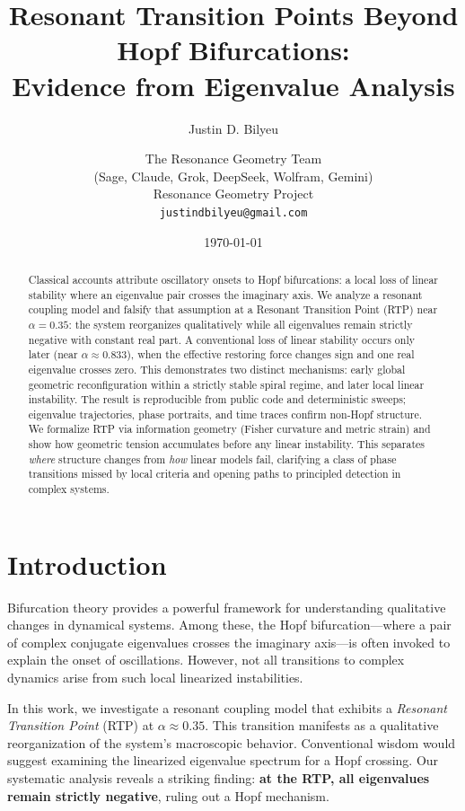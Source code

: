 \documentclass[11pt,twocolumn]{article}
\title{Resonant Transition Points Beyond Hopf Bifurcations:\\
Evidence from Eigenvalue Analysis}
\author{%
  Justin D. Bilyeu \and The Resonance Geometry Team\\
  (Sage, Claude, Grok, DeepSeek, Wolfram, Gemini)\\[0.5em]
  Resonance Geometry Project\\
  \texttt{justindbilyeu@gmail.com}
}
\date{\today}
\begin{document}
\maketitle

\begin{abstract}
Classical accounts attribute oscillatory onsets to Hopf bifurcations: a local loss of linear stability where an eigenvalue pair crosses the imaginary axis. We analyze a resonant coupling model and falsify that assumption at a Resonant Transition Point (RTP) near $\alpha\!=\!0.35$: the system reorganizes qualitatively while all eigenvalues remain strictly negative with constant real part. A conventional loss of linear stability occurs only later (near $\alpha\!\approx\!0.833$), when the effective restoring force changes sign and one real eigenvalue crosses zero. This demonstrates two distinct mechanisms: early global geometric reconfiguration within a strictly stable spiral regime, and later local linear instability. The result is reproducible from public code and deterministic sweeps; eigenvalue trajectories, phase portraits, and time traces confirm non-Hopf structure. We formalize RTP via information geometry (Fisher curvature and metric strain) and show how geometric tension accumulates before any linear instability. This separates \emph{where} structure changes from \emph{how} linear models fail, clarifying a class of phase transitions missed by local criteria and opening paths to principled detection in complex systems.
\end{abstract}

\section{Introduction}

Bifurcation theory provides a powerful framework for understanding qualitative changes in dynamical systems.
Among these, the Hopf bifurcation—where a pair of complex conjugate eigenvalues crosses the imaginary axis—is
often invoked to explain the onset of oscillations. However, not all transitions to complex dynamics arise
from such local linearized instabilities.

In this work, we investigate a resonant coupling model that exhibits a \emph{Resonant Transition Point} (RTP)
at $\alpha \approx 0.35$. This transition manifests as a qualitative reorganization of the system's macroscopic
behavior. Conventional wisdom would suggest examining the linearized eigenvalue spectrum for a Hopf crossing.
Our systematic analysis reveals a striking finding: \textbf{at the RTP, all eigenvalues remain strictly negative},
ruling out a Hopf mechanism.
\end{document}
